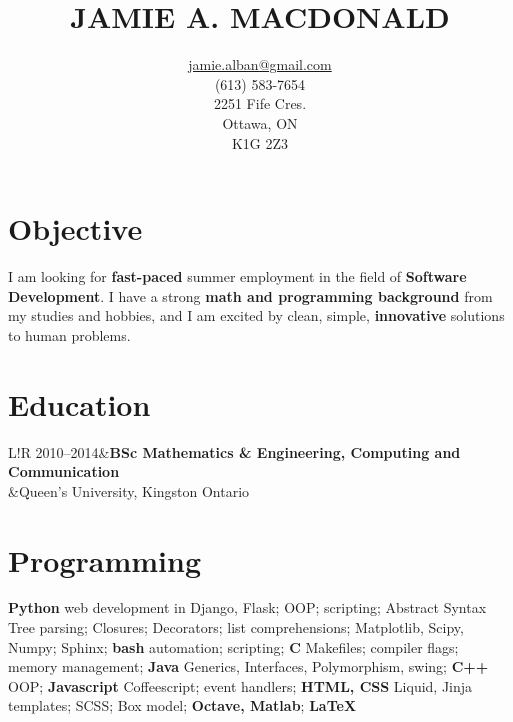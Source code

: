 \documentclass[11pt]{article}
\title{JAMIE A. MACDONALD}
\author{\href{mailto:jamie.alban@gmail.com}{jamie.alban@gmail.com}\\(613) 583-7654\\2251 Fife Cres.\\Ottawa, ON\\K1G 2Z3}
\date{}
\newcommand\VRule{\color{lightgray}\vrule width 0.5pt}
\begin{document}
\begin{minipage}{0.2\textwidth}
\hspace{0em}
\end{minipage}
\begin{minipage}{0.55\textwidth}
\vspace{-3em}
\maketitle
\end{minipage}
\begin{minipage}{0.25\textwidth}
\end{minipage}
\thispagestyle{fancy}
\vspace{-2.5em}
\section*{Objective}
I am looking for \textbf{fast-paced} summer employment in the field of \textbf{Software Development}. I have a strong \textbf{math and programming background} from my studies and hobbies, and I am excited by clean, simple, \textbf{innovative} solutions to human problems.
\section*{Education}
\begin{tabular}{L!{\VRule}R}
2010--2014&{\bf BSc Mathematics \& Engineering, Computing and Communication}\\
          &{Queen's University, Kingston Ontario}\\
\end{tabular}
\section*{Programming}
\textbf{Python} web development in Django, Flask; OOP; scripting; Abstract Syntax Tree parsing; Closures; Decorators; list comprehensions; Matplotlib, Scipy, Numpy; Sphinx; \textbf{bash} automation; scripting; \textbf{C} Makefiles; compiler flags; memory management; \textbf{Java} Generics, Interfaces, Polymorphism, swing; \textbf{C++} OOP; \textbf{Javascript} Coffeescript; event handlers; \textbf{HTML, CSS} Liquid, Jinja templates; SCSS; Box model; \textbf{Octave, Matlab}; \textbf{LaTeX}
\end{document}

